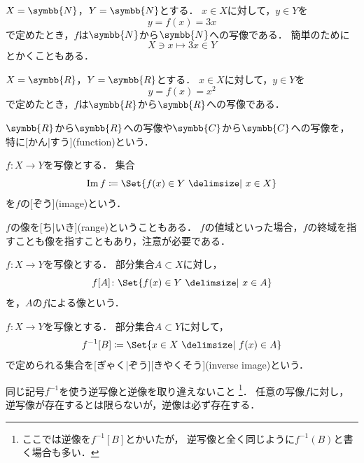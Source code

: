 \documentclass[../sotsu.tex]{subfiles}
\begin{document}
\begin{example}
    $X = \symbb{N}$，$Y = \symbb{N}$とする．
    $x \in X$に対して，$y \in Y$を
    \[ y = f(x) = 3x \]
    で定めたとき，$f$は$\symbb{N}$から$\symbb{N}$への写像である．
    簡単のために
    \[ X \ni x \mapsto 3x \in Y \]
    とかくこともある．
\end{example}

\begin{example}
    $X = \symbb{R}$，$Y = \symbb{R}$とする．
    $x \in X$に対して，$y \in Y$を
    \[ y = f(x) = x^2 \]
    で定めたとき，$f$は$\symbb{R}$から$\symbb{R}$への写像である．

    $\symbb{R}$から$\symbb{R}$への写像や$\symbb{C}$から$\symbb{C}$への写像を，特に[かん|すう](function)という．
\end{example}

\begin{definition}[像]
    \label{dfn:image}
    $f \colon X \to Y$を写像とする．
    集合
    \begin{equation}
        \image f  \coloneq  \Set{ f(x) \in Y  \given  x \in X }
    \end{equation}
    を$f$の[ぞう](image)という．
\end{definition}

$f$の像を[ち|いき](range)ということもある．
$f$の値域といった場合，$f$の終域を指すことも像を指すこともあり，注意が必要である．

\begin{definition}[部分集合の像]
    $f \colon X \to Y$を写像とする．
    部分集合$A \subset X$に対し，
    \begin{equation}
        f[A] \colon \Set{  f(x) \in Y  \given  x \in A  }
    \end{equation}
    を，$A$の$f$による像という．
\end{definition}

\begin{definition}[逆像]
    $f \colon X \to Y$を写像とする．
    部分集合$A \subset Y$に対して，
    \begin{equation}
        f^{-1}[B] \coloneq \Set{  x \in X  \given  f(x) \in A  }
    \end{equation}
    で定められる集合を[ぎゃく|ぞう][きやくそう](inverse image)という．
\end{definition}
同じ記号$f^{-1}$を使う逆写像と逆像を取り違えないこと%
\footnote{
    ここでは逆像を$f^{-1}[B]$とかいたが，
    逆写像と全く同じように$f^{-1}(B)$と書く場合も多い．
}．
任意の写像$f$に対し，逆写像が存在するとは限らないが，逆像は必ず存在する．
\end{document}

